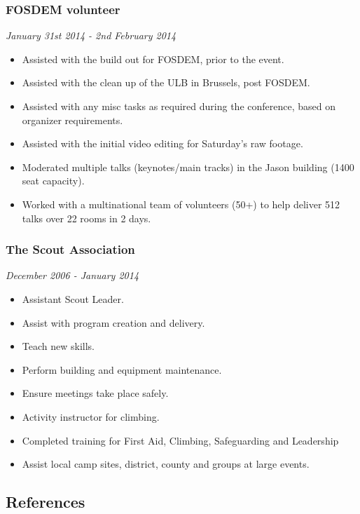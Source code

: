 \subsubsection{FOSDEM volunteer}\label{fosdem-volunteer}

\emph{January 31st 2014 - 2nd February 2014}

\begin{itemize}
\itemsep1pt\parskip0pt
\item
  Assisted with the build out for FOSDEM, prior to the event.
\item
  Assisted with the clean up of the ULB in Brussels, post FOSDEM.
\item
  Assisted with any misc tasks as required during the conference, based
  on organizer requirements.
\item
  Assisted with the initial video editing for Saturday's raw footage.
\item
  Moderated multiple talks (keynotes/main tracks) in the Jason building
  (1400 seat capacity).
\item
  Worked with a multinational team of volunteers (50+) to help deliver
  512 talks over 22 rooms in 2 days.
\end{itemize}

\subsubsection{The Scout Association}\label{the-scout-association}

\emph{December 2006 - January 2014}

\begin{itemize}
\itemsep1pt\parskip0pt
\item
  Assistant Scout Leader.
\item
  Assist with program creation and delivery.
\item
  Teach new skills.
\item
  Perform building and equipment maintenance.
\item
  Ensure meetings take place safely.
\item
  Activity instructor for climbing.
\item
  Completed training for First Aid, Climbing, Safeguarding and
  Leadership
\item
  Assist local camp sites, district, county and groups at large events.
\end{itemize}

\subsection{References}\label{references}


